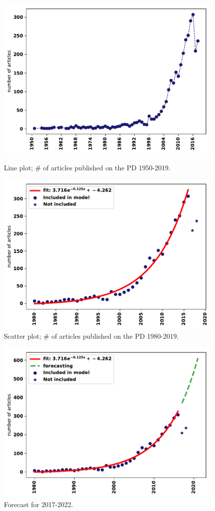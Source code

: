 \documentclass{article}
\theoremstyle{definition}
\begin{document}
\begin{figure}[!hbtp]
\begin{minipage}{.45\textwidth}
    \centering
    \includegraphics[width=.9\textwidth]{./assets/images/timeline.pdf}
    \caption{Line plot; \# of articles published on the PD 1950-2019.}\label{fig:timeseries}
\end{minipage}
\begin{minipage}{.45\textwidth}
    \centering
    \includegraphics[width=.9\textwidth]{./assets/images/fitting.pdf}
    \caption{Scatter plot; \# of articles published on the PD 1980-2019.}\label{fig:fitting}
\end{minipage}
\end{figure}

\begin{figure}[!hbtp]
    \centering
    \includegraphics[width=.5\textwidth]{./assets/images/forecasting.pdf}
    \caption{Forecast for 2017-2022.}\label{fig:forecasting}
\end{figure}
\end{document}
